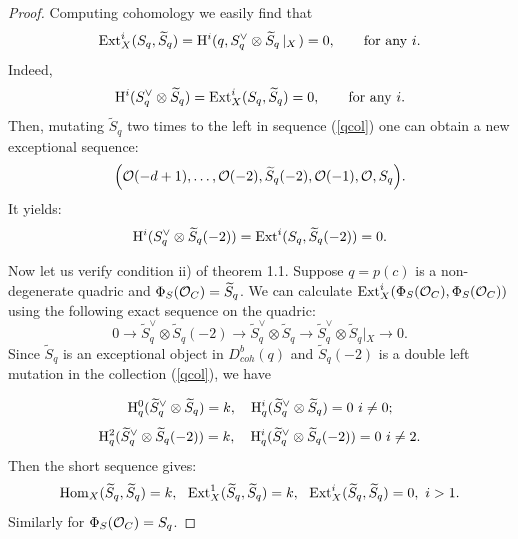 \documentclass[12pt]{article}
\begin{document}
\begin{proof}
Computing cohomology we easily find that 
$$
{\rm Ext}^i_X(S_q,\widetilde S_q)={\rm H}^i(q,S_q^{\vee}\otimes\widetilde S_q \left|_X\right.)=0,\qquad{\rm for\ any}\ i.
$$
Indeed,
$$
{\rm H}^i(S_q^{\vee}\otimes\widetilde S_q )={\rm Ext}^i_X(S_q,\widetilde S_q)=0,\qquad{\rm for\ any}\ i.
$$
Then, mutating $\widetilde S_q$ two times to the left in   sequence (\ref{qcol}) one can obtain a new exceptional sequence:
$$\Bigl({\cal O}(-d+1),\ldots,{\cal O}(-2),\widetilde
S_q(-2),{\cal O}(-1),{\cal O},S_q\Bigr).$$
It yields:
$$
{\rm H}^i(S^{\vee}_q\otimes \widetilde S_q(-2))={\rm Ext}^i(S_q,\widetilde S_q(-2))=0.
$$

Now let us verify condition ii) of theorem 1.1. Suppose $q=p(c)$ is a non-degenerate quadric and $\Phi_S({\cal O}_C)=\widetilde S_q$. We can calculate 
${\rm Ext}^i_X(\Phi_S({\cal O}_C),\Phi_S({\cal O}_C)) $ using the following exact sequence on the quadric:
$$
0 \longrightarrow \widetilde S^{\vee}_q\otimes \widetilde S_q(-2)
 \longrightarrow \widetilde S^{\vee}_q\otimes \widetilde S_q \longrightarrow \widetilde S^{\vee}_q\otimes \widetilde S_q\left |_X\right.\longrightarrow 0.
$$
Since $\widetilde S_q$ is an exceptional object in $D^b_{coh}(q)$ and $\widetilde S_q(-2)$ is a double left mutation in the collection (\ref{qcol}), we have



$$
{\rm H}^0_q(\widetilde S^{\vee}_q\otimes \widetilde S_q)=k,\quad
{\rm H}^i_q(\widetilde S^{\vee}_q\otimes \widetilde S_q)=0\ i\not=0;
$$
$$
{\rm H}^2_q(\widetilde S^{\vee}_q\otimes \widetilde S_q(-2))=k,\quad
{\rm H}^i_q(\widetilde S^{\vee}_q\otimes \widetilde S_q(-2))=0\ i\not=2.
$$
Then the short sequence gives:
$$
{\rm Hom}_X( \widetilde S_q, \widetilde S_q)=k,\ \ 
{\rm Ext}^1_X( \widetilde S_q, \widetilde S_q)=k,\ \ 
{\rm Ext}^i_X( \widetilde S_q, \widetilde S_q)=0,\  i>1.
$$
Similarly for $\Phi_S({\cal O}_C)=S_q$.


\end{proof}
\end{document}
